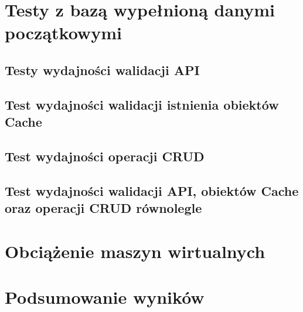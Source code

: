 
\clearpage

\newpage
\section{Testy z bazą wypełnioną danymi początkowymi}
\subsection{Testy wydajności walidacji API}

\clearpage

\subsection{Test wydajności walidacji istnienia obiektów Cache}
% 
\clearpage

\subsection{Test wydajności operacji CRUD}
% 
\clearpage

\subsection{Test wydajności walidacji API, obiektów Cache oraz operacji CRUD równolegle }
% 
\clearpage

\section{Obciążenie maszyn wirtualnych}

\newpage
\section{Podsumowanie wyników}
